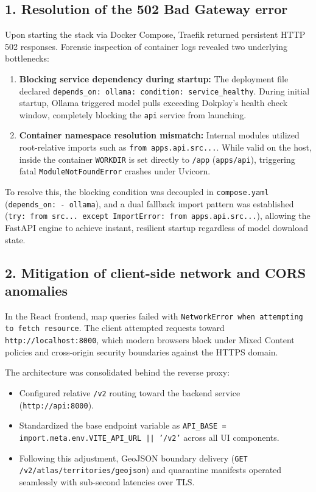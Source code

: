 \documentclass[11pt,a4paper]{article}
\begin{document}
\subsection{1. Resolution of the 502 Bad Gateway error}
Upon starting the stack via Docker Compose, Traefik returned persistent HTTP 502 responses. Forensic inspection of container logs revealed two underlying bottlenecks:
\begin{enumerate}[leftmargin=*]
    \item \textbf{Blocking service dependency during startup:} The deployment file declared \texttt{depends\_on: ollama: condition: service\_healthy}. During initial startup, Ollama triggered model pulls exceeding Dokploy's health check window, completely blocking the \texttt{api} service from launching.
    \item \textbf{Container namespace resolution mismatch:} Internal modules utilized root-relative imports such as \texttt{from apps.api.src...}. While valid on the host, inside the container \texttt{WORKDIR} is set directly to \texttt{/app} (\texttt{apps/api}), triggering fatal \texttt{ModuleNotFoundError} crashes under Uvicorn.
\end{enumerate}
To resolve this, the blocking condition was decoupled in \texttt{compose.yaml} (\texttt{depends\_on: - ollama}), and a dual fallback import pattern was established (\texttt{try: from src... except ImportError: from apps.api.src...}), allowing the FastAPI engine to achieve instant, resilient startup regardless of model download state.

\subsection{2. Mitigation of client-side network and CORS anomalies}
In the React frontend, map queries failed with \texttt{NetworkError when attempting to fetch resource}. The client attempted requests toward \texttt{http://localhost:8000}, which modern browsers block under Mixed Content policies and cross-origin security boundaries against the HTTPS domain.

The architecture was consolidated behind the reverse proxy:
\begin{itemize}[leftmargin=*]
    \item Configured relative \texttt{/v2} routing toward the backend service (\texttt{http://api:8000}).
    \item Standardized the base endpoint variable as \texttt{API\_BASE = import.meta.env.VITE\_API\_URL || '/v2'} across all UI components.
    \item Following this adjustment, GeoJSON boundary delivery (\texttt{GET /v2/atlas/territories/geojson}) and quarantine manifests operated seamlessly with sub-second latencies over TLS.
\end{itemize}
\end{document}
